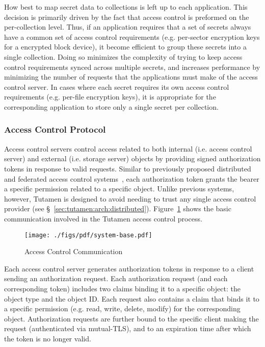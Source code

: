 How best to map secret data to collections is left up to each
application. This decision is primarily driven by the fact that access
control is preformed on the per-collection level. Thus, if an
application requires that a set of secrets always have a common set
of access control requirements (e.g. per-sector encryption keys for a
encrypted block device), it become efficient to group these secrets
into a single collection. Doing so minimizes the complexity of trying
to keep access control requirements synced across multiple secrets, and
increases performance by minimizing the number of requests that the
applications must make of the access control server. In cases where
each secret requires its own access control requirements
(e.g. per-file encryption keys), it is appropriate for the
corresponding application to store only a single secret per
collection.

\subsubsection{Access Control Protocol}
\label{sec:tutamen:arch:acp}

Access control servers control access related to both internal
(i.e. access control server) and external (i.e. storage server)
objects by providing signed authorization tokens in response to valid
requests. Similar to previously proposed distributed and federated
access control systems~\cite{Calero2010, Leandro2012},
each authorization token grants the bearer a specific permission
related to a specific object. Unlike previous systems, however,
Tutamen is designed to avoid needing to trust any single access
control provider (see \S~\ref{sec:tutamen:arch:distributed}).
Figure~\ref{fig:tutamen:systembase} shows the basic communication
involved in the Tutamen access control process.

\begin{figure}[th]
  \centering
  \texttt{[image: ./figs/pdf/system-base.pdf]}
  \caption{Access Control Communication}
  \label{fig:tutamen:systembase}
\end{figure}

Each access control server generates authorization tokens in response
to a client sending an authorization request. Each authorization
request (and each corresponding token) includes two claims binding it
to a specific object: the object type and the object ID. Each request
also contains a claim that binds it to a specific permission
(e.g. read, write, delete, modify) for the corresponding
object. Authorization requests are further bound to the specific
client making the request (authenticated via mutual-TLS), and to an
expiration time after which the token is no longer valid.

